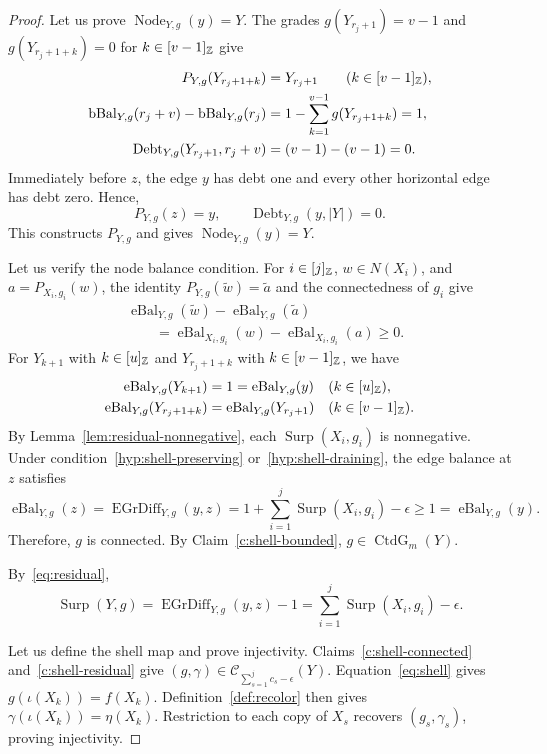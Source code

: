\begin{proof}
Let us prove $\operatorname{Node}_{Y,g}(y)=Y$.
The grades $g(Y_{r_j+1})=v-1$ and $g(Y_{r_j+1+k})=0$ for $k\in[v-1]_{\mathbb Z}$ give
\[
\begin{aligned}
 P_{Y,g}(Y_{r_j+1+k})&=Y_{r_j+1}\qquad(k\in[v-1]_{\mathbb Z}),\\
 \operatorname{bBal}_{Y,g}(r_j+v)-\operatorname{bBal}_{Y,g}(r_j)
 &=1-\sum_{k=1}^{v-1}g(Y_{r_j+1+k})=1,\\
 \operatorname{Debt}_{Y,g}(Y_{r_j+1},r_j+v)&=(v-1)-(v-1)=0.
\end{aligned}
\]
Immediately before $z$, the edge $y$ has debt one and every other horizontal edge has debt zero.
Hence,
\[
 P_{Y,g}(z)=y,\qquad
 \operatorname{Debt}_{Y,g}(y,|Y|)=0.
\]
This constructs $P_{Y,g}$ and gives $\operatorname{Node}_{Y,g}(y)=Y$.

Let us verify the node balance condition. For $i\in[j]_{\mathbb Z}$, $w\in N(X_i)$, and
$a=P_{X_i,g_i}(w)$, the identity $P_{Y,g}(\widetilde w)=\widetilde a$ and the connectedness of $g_i$ give
\[
\begin{aligned}
 &\operatorname{eBal}_{Y,g}(\widetilde w)-\operatorname{eBal}_{Y,g}(\widetilde a)\\
 &\qquad=\operatorname{eBal}_{X_i,g_i}(w)-\operatorname{eBal}_{X_i,g_i}(a)\ge0.
\end{aligned}
\]
For $Y_{k+1}$ with $k\in[u]_{\mathbb Z}$ and $Y_{r_j+1+k}$ with $k\in[v-1]_{\mathbb Z}$, we have
\[
\begin{aligned}
 \operatorname{eBal}_{Y,g}(Y_{k+1})&=1=\operatorname{eBal}_{Y,g}(y)
 &&(k\in[u]_{\mathbb Z}),\\
 \operatorname{eBal}_{Y,g}(Y_{r_j+1+k})&=\operatorname{eBal}_{Y,g}(Y_{r_j+1})
 &&(k\in[v-1]_{\mathbb Z}).
\end{aligned}
\]
By Lemma~\ref{lem:residual-nonnegative}, each $\operatorname{Surp}(X_i,g_i)$ is nonnegative.
Under condition~\ref{hyp:shell-preserving} or~\ref{hyp:shell-draining}, the edge balance at $z$ satisfies
\[
 \operatorname{eBal}_{Y,g}(z)=\operatorname{EGrDiff}_{Y,g}(y,z)
 =1+\sum_{i=1}^j\operatorname{Surp}(X_i,g_i)-\epsilon
 \ge1=\operatorname{eBal}_{Y,g}(y).
\]
Therefore, $g$ is connected. By Claim~\ref{c:shell-bounded},
$g\in\operatorname{CtdG}_m(Y)$.

By~\eqref{eq:residual},
\[
 \operatorname{Surp}(Y,g)=\operatorname{EGrDiff}_{Y,g}(y,z)-1
 =\sum_{i=1}^j\operatorname{Surp}(X_i,g_i)-\epsilon.
\]

 Let us define the shell map and prove injectivity.
Claims~\ref{c:shell-connected} and~\ref{c:shell-residual} give
$(g,\gamma)\in\mathcal C_{\sum_{s=1}^j c_s-\epsilon}(Y)$.
Equation~\eqref{eq:shell} gives $g(\iota(X_k))=f(X_k)$.
Definition~\ref{def:recolor} then gives $\gamma(\iota(X_k))=\eta(X_k)$.
Restriction to each copy of $X_s$ recovers $(g_s,\gamma_s)$, proving injectivity.


\end{proof}
